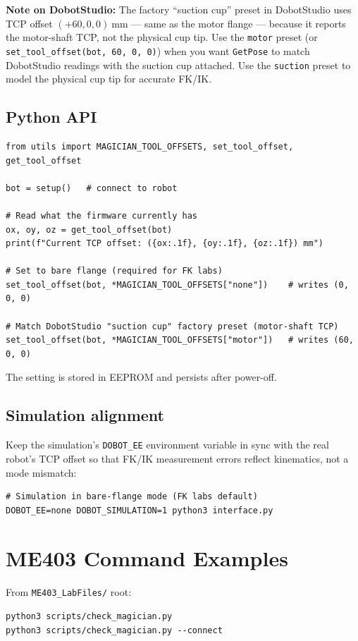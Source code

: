 \documentclass[11pt,a4paper]{article}
\begin{document}
\textbf{Note on DobotStudio:} The factory ``suction cup'' preset in DobotStudio
uses TCP offset \((+60, 0, 0)\ \mathrm{mm}\) --- same as the motor flange ---
because it reports the motor-shaft TCP, not the physical cup tip. Use the
\texttt{motor} preset (or \texttt{set\_tool\_offset(bot, 60, 0, 0)}) when you
want \texttt{GetPose} to match DobotStudio readings with the suction cup attached.
Use the \texttt{suction} preset to model the physical cup tip for accurate FK/IK.

\subsection*{Python API}

\begin{lstlisting}[style=pycode]
from utils import MAGICIAN_TOOL_OFFSETS, set_tool_offset, get_tool_offset

bot = setup()   # connect to robot

# Read what the firmware currently has
ox, oy, oz = get_tool_offset(bot)
print(f"Current TCP offset: ({ox:.1f}, {oy:.1f}, {oz:.1f}) mm")

# Set to bare flange (required for FK labs)
set_tool_offset(bot, *MAGICIAN_TOOL_OFFSETS["none"])    # writes (0, 0, 0)

# Match DobotStudio "suction cup" factory preset (motor-shaft TCP)
set_tool_offset(bot, *MAGICIAN_TOOL_OFFSETS["motor"])   # writes (60, 0, 0)
\end{lstlisting}

The setting is stored in EEPROM and persists after power-off.

\subsection*{Simulation alignment}

Keep the simulation's \texttt{DOBOT\_EE} environment variable in sync with the
real robot's TCP offset so that FK/IK measurement errors reflect kinematics,
not a mode mismatch:

\begin{verbatim}
# Simulation in bare-flange mode (FK labs default)
DOBOT_EE=none DOBOT_SIMULATION=1 python3 interface.py
\end{verbatim}

\section{ME403 Command Examples}
From \texttt{ME403\_LabFiles/} root:
\begin{verbatim}
python3 scripts/check_magician.py
python3 scripts/check_magician.py --connect
\end{verbatim}
\end{document}
